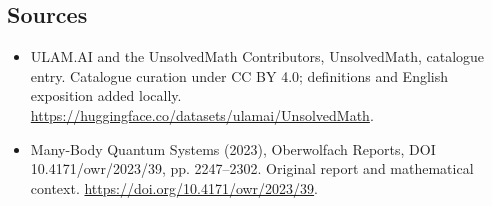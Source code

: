 \documentclass[11pt]{article}
\begin{document}
\subsection{Sources}
\begin{itemize}
\item[\hypertarget{source:statement:1}{S1}] ULAM.AI and the UnsolvedMath Contributors, UnsolvedMath, catalogue entry. Catalogue curation under CC BY 4.0; definitions and English exposition added locally.
\url{https://huggingface.co/datasets/ulamai/UnsolvedMath}.
\item[\hypertarget{source:statement:2}{S2}] Many-Body Quantum Systems (2023), Oberwolfach Reports, DOI 10.4171/owr/2023/39, pp. 2247--2302. Original report and mathematical context.
\url{https://doi.org/10.4171/owr/2023/39}.
\end{itemize}
\label{end:statement}
\end{document}
